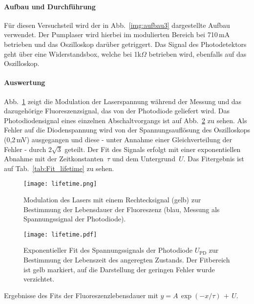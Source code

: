 \paragraph{Aufbau und Durchführung}

Für diesen Versuchsteil wird der in Abb.~\ref{img:aufbau3} dargestellte Aufbau verwendet.
Der Pumplaser wird hierbei im modulierten Bereich bei 710\,mA betrieben und das Oszilloskop darüber getriggert. Das Signal des Photodetektors geht über eine Widerstandsbox, welche bei 1k$\Omega$ betrieben wird, ebenfalls auf das Oszilloskop.

\paragraph{Auswertung}
Abb.~\ref{img:Lifetime} zeigt die Modulation der Laserspannung während der Messung und das
dazugehörige Fluoreszenzsignal, das von der Photodiode geliefert wird.
Das Photodiodensignal eines einzelnen Abschaltvorgangs ist auf Abb.~\ref{img:LifetimeFit} zu sehen. 
Als Fehler auf die Diodenspannung wird von der Spannungsauflösung des Oszilloskops
(0,2\,mV) ausgegangen und diese - unter Annahme einer Gleichverteilung der Fehler - durch
$2\sqrt{3}$ geteilt.
Der Fit des Signals erfolgt mit einer exponentiellen Abnahme mit der Zeitkonstanten~$\tau$ und dem
Untergrund~$U$. Das Fitergebnis ist auf Tab.~\ref{tab:Fit_lifetime} zu sehen.


\begin{figure}[H]
\begin{center}
  \texttt{[image: lifetime.png]}
  \caption{Modulation des Lasers mit einem Rechtecksignal (gelb) zur Bestimmung der Lebensdauer der
  Fluoreszenz (blau, Messung als Spannungssignal der Photodiode).}
  \label{img:Lifetime}
\end{center}
\end{figure}


\begin{figure}[H]
\begin{center}
  \texttt{[image: lifetime.pdf]}
  \caption{Exponentieller Fit des Spannungssignals der Photodiode $U_{\text{PD}}$ zur Bestimmung der
  Lebenszeit des angeregten Zustands. Der Fitbereich ist gelb markiert, auf die Darstellung der geringen Fehler
  wurde verzichtet.}
  \label{img:LifetimeFit}
\end{center}
\end{figure}

\begin{table}[htb]
\caption{Ergebnisse des Fits der Fluoreszenzlebensdauer mit
$y=A\,\exp(-x/\tau)\,+\,U$.}

\label{tab:Fit_lifetime}
\end{table}


